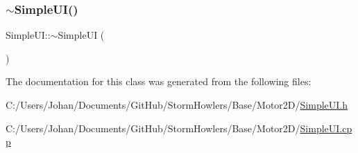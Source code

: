 \subsubsection{\texorpdfstring{$\sim$SimpleUI()}{~SimpleUI()}}
{\footnotesize\ttfamily Simple\+U\+I\+::$\sim$\+Simple\+UI (\begin{DoxyParamCaption}{ }\end{DoxyParamCaption})}



The documentation for this class was generated from the following files\+:\begin{DoxyCompactItemize}
\item 
C\+:/\+Users/\+Johan/\+Documents/\+Git\+Hub/\+Storm\+Howlers/\+Base/\+Motor2\+D/\mbox{\hyperlink{_simple_u_i_8h}{Simple\+U\+I.\+h}}\item 
C\+:/\+Users/\+Johan/\+Documents/\+Git\+Hub/\+Storm\+Howlers/\+Base/\+Motor2\+D/\mbox{\hyperlink{_simple_u_i_8cpp}{Simple\+U\+I.\+cpp}}\end{DoxyCompactItemize}
